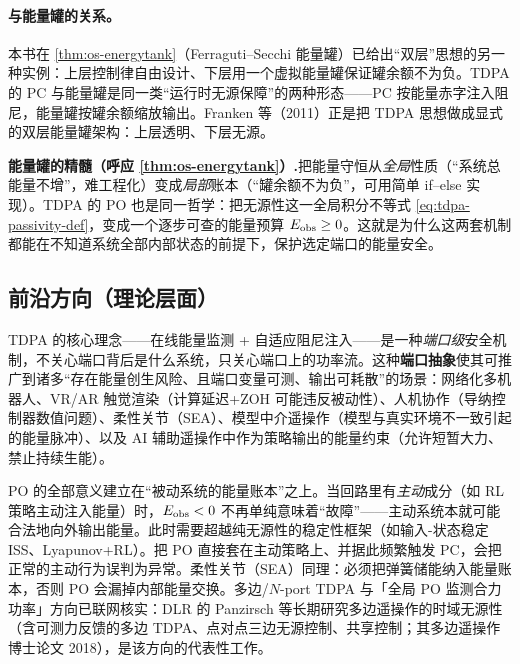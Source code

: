 \paragraph{与能量罐的关系。}
本书在 \cref{thm:os-energytank}（Ferraguti--Secchi 能量罐）已给出“双层”思想的另一种实例：上层控制律自由设计、下层用一个虚拟能量罐保证罐余额不为负。TDPA 的 PC 与能量罐是同一类“运行时无源保障”的两种形态——PC 按能量赤字注入阻尼，能量罐按罐余额缩放输出。Franken 等（2011）正是把 TDPA 思想做成显式的双层能量罐架构：上层透明、下层无源。

\begin{insight}
\textbf{能量罐的精髓（呼应 \cref{thm:os-energytank}）.}\;把能量守恒从\emph{全局}性质（“系统总能量不增”，难工程化）变成\emph{局部}账本（“罐余额不为负”，可用简单 if--else 实现）。TDPA 的 PO 也是同一哲学：把无源性这一全局积分不等式 \cref{eq:tdpa-passivity-def}，变成一个逐步可查的能量预算 $E_{\rm obs}\ge0$。这就是为什么这两套机制都能在不知道系统全部内部状态的前提下，保护选定端口的能量安全。
\end{insight}

\subsection{前沿方向（理论层面）}
\label{sec:tdpa-frontier}

TDPA 的核心理念——在线能量监测 + 自适应阻尼注入——是一种\emph{端口级}安全机制，不关心端口背后是什么系统，只关心端口上的功率流。这种\textbf{端口抽象}使其可推广到诸多“存在能量创生风险、且端口变量可测、输出可耗散”的场景：网络化多机器人、VR/AR 触觉渲染（计算延迟+ZOH 可能违反被动性）、人机协作（导纳控制器数值问题）、柔性关节（SEA）、模型中介遥操作（模型与真实环境不一致引起的能量脉冲）、以及 AI 辅助遥操作中作为策略输出的能量约束（允许短暂大力、禁止持续生能）。

\begin{pitfall}
PO 的全部意义建立在“被动系统的能量账本”之上。当回路里有\emph{主动}成分（如 RL 策略主动注入能量）时，$E_{\rm obs}<0$ 不再单纯意味着“故障”——主动系统本就可能合法地向外输出能量。此时需要超越纯无源性的稳定性框架（如输入-状态稳定 ISS、Lyapunov+RL）。把 PO 直接套在主动策略上、并据此频繁触发 PC，会把正常的主动行为误判为异常。柔性关节（SEA）同理：必须把弹簧储能纳入能量账本，否则 PO 会漏掉内部能量交换。多边/$N$-port TDPA 与「全局 PO 监测合力功率」方向已联网核实：DLR 的 Panzirsch 等长期研究多边遥操作的时域无源性（含可测力反馈的多边 TDPA、点对点三边无源控制、共享控制；其多边遥操作博士论文 2018），是该方向的代表性工作。
\end{pitfall}

